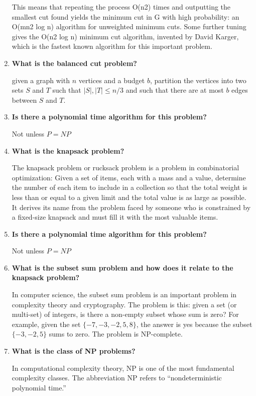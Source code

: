 \documentclass[a4paper,11pt]{article}
\begin{document}
\begin{enumerate}
  This means that repeating the process O(n2) times and outputting the
  smallest cut found yields the minimum cut in G with high probability:
  an O(mn2 log n) algorithm for unweighted minimum cuts. Some further
  tuning gives the O(n2 log n) minimum cut algorithm, invented by David
  Karger, which is the fastest known algorithm for this important
  problem.
\item
  \textbf{What is the balanced cut problem?}

  given a graph with $n$ vertices and a budget $b$, partition the
  vertices into two sets $S$ and $T$ such that $|S|,|T| \le n/3$ and
  such that there are at most $b$ edges between $S$ and $T$.
\item
  \textbf{Is there a polynomial time algorithm for this problem?}

  Not unless $P = NP$
\item
  \textbf{What is the knapsack problem?}

  The knapsack problem or rucksack problem is a problem in combinatorial
  optimization: Given a set of items, each with a mass and a value,
  determine the number of each item to include in a collection so that
  the total weight is less than or equal to a given limit and the total
  value is as large as possible. It derives its name from the problem
  faced by someone who is constrained by a fixed-size knapsack and must
  fill it with the most valuable items.
\item
  \textbf{Is there a polynomial time algorithm for this problem?}

  Not unless $P = NP$
\item
  \textbf{What is the subset sum problem and how does it relate to the
  knapsack problem?}

  In computer science, the subset sum problem is an important problem in
  complexity theory and cryptography. The problem is this: given a set
  (or multi-set) of integers, is there a non-empty subset whose sum is
  zero? For example, given the set $\{ -7, -3, -2, 5, 8\}$, the answer
  is yes because the subset $\{ -3, -2, 5 \}$ sums to zero. The problem
  is NP-complete.
\item
  \textbf{What is the class of NP problems?}

  In computational complexity theory, NP is one of the most fundamental
  complexity classes. The abbreviation NP refers to ``nondeterministic
  polynomial time.''


\end{enumerate}
\end{document}
